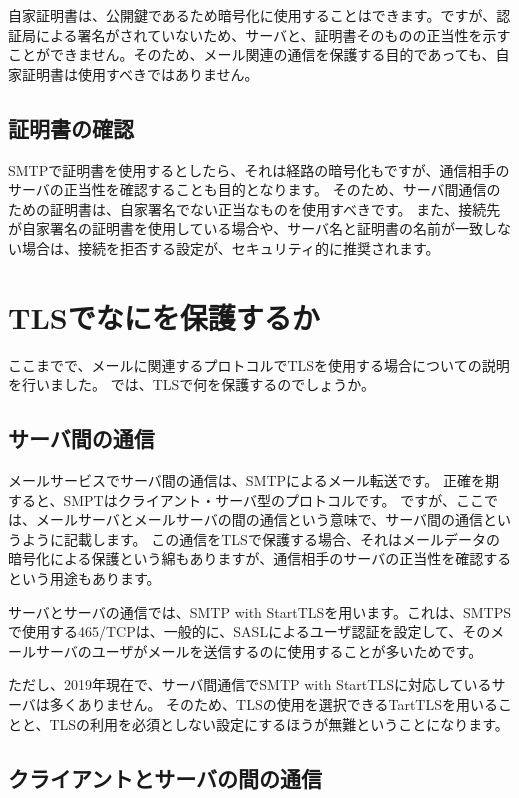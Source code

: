 自家証明書は、公開鍵であるため暗号化に使用することはできます。ですが、認証局による署名がされていないため、サーバと、証明書そのものの正当性を示すことができません。そのため、メール関連の通信を保護する目的であっても、自家証明書は使用すべきではありません。

\subsection{証明書の確認}

SMTPで証明書を使用するとしたら、それは経路の暗号化もですが、通信相手のサーバの正当性を確認することも目的となります。
そのため、サーバ間通信のための証明書は、自家署名でない正当なものを使用すべきです。
また、接続先が自家署名の証明書を使用している場合や、サーバ名と証明書の名前が一致しない場合は、接続を拒否する設定が、セキュリティ的に推奨されます。



\section{TLSでなにを保護するか}

ここまでで、メールに関連するプロトコルでTLSを使用する場合についての説明を行いました。
では、TLSで何を保護するのでしょうか。

\subsection{サーバ間の通信}

メールサービスでサーバ間の通信は、SMTPによるメール転送です。
正確を期すると、SMPTはクライアント・サーバ型のプロトコルです。
ですが、ここでは、メールサーバとメールサーバの間の通信という意味で、サーバ間の通信というように記載します。
この通信をTLSで保護する場合、それはメールデータの暗号化による保護という綿もありますが、通信相手のサーバの正当性を確認するという用途もあります。

サーバとサーバの通信では、SMTP with StartTLSを用います。これは、SMTPSで使用する465/TCPは、一般的に、SASLによるユーザ認証を設定して、そのメールサーバのユーザがメールを送信するのに使用することが多いためです。

ただし、2019年現在で、サーバ間通信でSMTP with StartTLSに対応しているサーバは多くありません。
そのため、TLSの使用を選択できるTartTLSを用いることと、TLSの利用を必須としない設定にするほうが無難ということになります。


\subsection{クライアントとサーバの間の通信}

